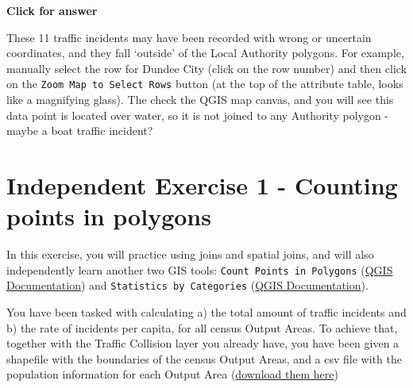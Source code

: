 \documentclass[
  letterpaper,
  DIV=11,
  numbers=noendperiod]{scrreprt}
\begin{document}
\begin{tcolorbox}[enhanced jigsaw, leftrule=.75mm, colframe=quarto-callout-important-color-frame, breakable, toprule=.15mm, bottomrule=.15mm, arc=.35mm, rightrule=.15mm, opacityback=0, colback=white, left=2mm]

\vspace{-3mm}\textbf{Click for answer}\vspace{3mm}

These 11 traffic incidents may have been recorded with wrong or
uncertain coordinates, and they fall `outside' of the Local Authority
polygons. For example, manually select the row for Dundee City (click on
the row number) and then click on the
\texttt{Zoom\ Map\ to\ Select\ Rows} button (at the top of the attribute
table, looks like a magnifying glass). The check the QGIS map canvas,
and you will see this data point is located over water, so it is not
joined to any Authority polygon - maybe a boat traffic incident?

\end{tcolorbox}

\section{Independent Exercise 1 - Counting points in
polygons}\label{independent-exercise-1---counting-points-in-polygons}

In this exercise, you will practice using joins and spatial joins, and
will also independently learn another two GIS tools:
\texttt{Count\ Points\ in\ Polygons}
(\href{https://docs.qgis.org/3.34/en/docs/user_manual/processing_algs/qgis/vectoranalysis.html\#count-points-in-polygon}{QGIS
Documentation}) and \texttt{Statistics\ by\ Categories}
(\href{https://docs.qgis.org/3.34/en/docs/user_manual/processing_algs/qgis/vectoranalysis.html\#qgisstatisticsbycategories}{QGIS
Documentation}).

You have been tasked with calculating a) the total amount of traffic
incidents and b) the rate of incidents per capita, for all census Output
Areas. To achieve that, together with the Traffic Collision layer you
already have, you have been given a shapefile with the boundaries of the
census Output Areas, and a csv file with the population information for
each Output Area
(\href{https://stir-my.sharepoint.com/:u:/g/personal/ala2_stir_ac_uk/EbDVBY1vzPFFmXze9NnPAXMB_5agSBMugN0pEkmlDoBo1w?e=FcK74N}{download
them here})
\end{document}
